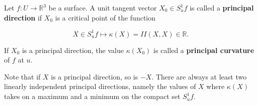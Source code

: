 Let $f: U \to \mathbb{R}^3$ be a surface. A unit tangent vector $X_0 \in S_u^1 f$ is called a \textbf{principal direction} if $X_0$ is a critical point of the function

$$X \in S_u^1 f \mapsto \kappa(X) = II(X, X) \in \mathbb{R}.$$

If $X_0$ is a principal direction, the value $\kappa(X_0)$ is called a \textbf{principal curvature} of $f$ at $u$.

Note that if $X$ is a principal direction, so is $-X$. There are always at least two linearly independent principal directions, namely the values of $X$ where $\kappa(X)$ takes on a maximum and a minimum on the compact set $S_u^1 f$.
